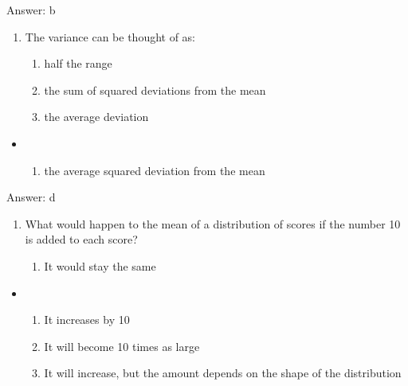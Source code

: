 \documentclass[]{article}
\providecommand{\tightlist}{%
  \setlength{\itemsep}{0pt}\setlength{\parskip}{0pt}}
\begin{document}
Answer: b

\begin{enumerate}
\def\labelenumi{\arabic{enumi}.}
\setcounter{enumi}{12}
\item
  The variance can be thought of as:

  \begin{enumerate}
  \def\labelenumii{\alph{enumii}.}
  \tightlist
  \item
    half the range
  \item
    the sum of squared deviations from the mean
  \item
    the average deviation
  \end{enumerate}
\end{enumerate}

\begin{itemize}
\item
  \begin{enumerate}
  \def\labelenumi{\alph{enumi}.}
  \setcounter{enumi}{3}
  \tightlist
  \item
    the average squared deviation from the mean
  \end{enumerate}
\end{itemize}

Answer: d

\begin{enumerate}
\def\labelenumi{\arabic{enumi}.}
\setcounter{enumi}{13}
\item
  What would happen to the mean of a distribution of scores if the
  number 10 is added to each score?

  \begin{enumerate}
  \def\labelenumii{\alph{enumii}.}
  \tightlist
  \item
    It would stay the same
  \end{enumerate}
\end{enumerate}

\begin{itemize}
\item
  \begin{enumerate}
  \def\labelenumi{\alph{enumi}.}
  \setcounter{enumi}{1}
  \tightlist
  \item
    It increases by 10
  \item
    It will become 10 times as large
  \item
    It will increase, but the amount depends on the shape of the
    distribution
  \end{enumerate}
\end{itemize}
\end{document}

